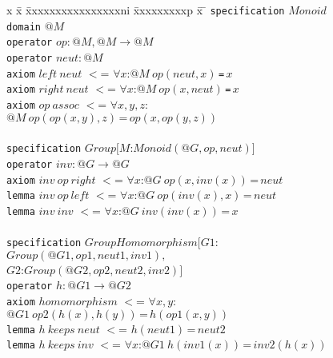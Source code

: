 \documentclass{article}
\theoremstyle{remark}
\theoremstyle{definition}
\newcommand{\ieq}{\,\texttt{=}\,}
\newcommand{\name}[1]{\mathit{#1}}
\begin{document}
\begin{figure}[t]
\begin{tabbing}
x \= x \= xxxxxxxxxxxxxxxxni \= xxxxxxxxxp \= x \= \kill
\texttt{specification} $\name{Monoid}$ \\
\> \texttt{domain} $@M$ \\
\> \texttt{operator} $\name{op} : @M, @M \rightarrow @M$\\
\> \texttt{operator} $\name{neut} : @M$ \\
\> \texttt{axiom} $\name{left}\ \name{neut}$ $<$= $\forall x$:$@M\ \name{op}(\name{neut},x)$\ieq$x$ \\
\> \texttt{axiom} $\name{right}\ \name{neut}$ $<$= $\forall x$:$@M\ \name{op}(x,\name{neut})$\ieq$x$ \\
\> \texttt{axiom} $\name{op}\ \name{assoc}$ $<$= $\forall x,y,z$:$@M\ \name{op}(\name{op}(x,y),z)\ieq\name{op}(x,\name{op}(y,z))$ \\
\\
\texttt{specification} $\name{Group}[M$:$\name{Monoid}(@G,\name{op},\name{neut})]$ \\
\> \texttt{operator} $\name{inv} : @G \rightarrow @G$ \\
\> \texttt{axiom} $\name{inv}\ \name{op}\ \name{right}$ $<$= $\forall x$:$@G\ \name{op}(x,\name{inv}(x))\ieq \name{neut}$ \\
\> \texttt{lemma} $\name{inv}\ \name{op}\ \name{left}$ $<$= $\forall x$:$@G\ \name{op}(\name{inv}(x),x)\ieq \name{neut}$ \\
\> \texttt{lemma} $\name{inv}\ \name{inv}$ $<$= $\forall x$:$@G\ \name{inv}(\name{inv}(x))\ieq x$ \\
\\
\texttt{specification} $\name{GroupHomomorphism}[G1$:$\name{Group}(@G1,\name{op1},\name{neut1},\name{inv1}),$ \\
\> \> \> \> $G2$:$\name{Group}(@G2,\name{op2},\name{neut2},\name{inv2})]$ \\
\> \texttt{operator} $h : @G1 \rightarrow @G2$ \\
\> \texttt{axiom} $\name{homomorphism}$ $<$= $\forall x,y$:$@G1\ \name{op2}(h(x),h(y))\ieq h(\name{op1}(x,y))$ \\
\> \texttt{lemma} $\name{h}\ \name{keeps}\ \name{neut}$ $<$= $h(\name{neut1})\ieq \name{neut2}$ \\
\> \texttt{lemma} $\name{h}\ \name{keeps}\ \name{inv}$ $<$= $\forall x$:$@G1\  h(\name{inv1}(x))\ieq \name{inv2}(h(x))$ \\
\\

\end{tabbing}
\end{figure}
\end{document}
